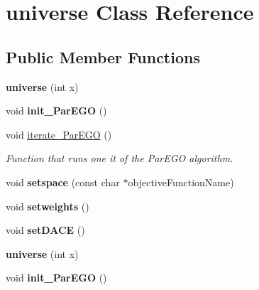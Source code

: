 \hypertarget{classuniverse}{}\section{universe Class Reference}
\label{classuniverse}
\subsection*{Public Member Functions}
\begin{DoxyCompactItemize}
\item 
\hypertarget{classuniverse_ad7994ce7b9e88a1faa56cf84f6c56b54}{}{\bfseries universe} (int x)\label{classuniverse_ad7994ce7b9e88a1faa56cf84f6c56b54}

\item 
\hypertarget{classuniverse_afe5bdbf5e9f3e4978becf23edcc7d201}{}void {\bfseries init\+\_\+\+Par\+E\+G\+O} ()\label{classuniverse_afe5bdbf5e9f3e4978becf23edcc7d201}

\item 
\hypertarget{classuniverse_a0b52db1da3e7f8f43a8946cbb87390d0}{}void \hyperlink{classuniverse_a0b52db1da3e7f8f43a8946cbb87390d0}{iterate\+\_\+\+Par\+E\+G\+O} ()\label{classuniverse_a0b52db1da3e7f8f43a8946cbb87390d0}

\begin{DoxyCompactList}\small\item\em Function that runs one it of the Par\+E\+G\+O algorithm. \end{DoxyCompactList}\item 
\hypertarget{classuniverse_a2bd3a92e07682c895e8143442f7f6419}{}void {\bfseries setspace} (const char $\ast$objective\+Function\+Name)\label{classuniverse_a2bd3a92e07682c895e8143442f7f6419}

\item 
\hypertarget{classuniverse_a5f97f94ebddc20321623d15d8ebcee26}{}void {\bfseries setweights} ()\label{classuniverse_a5f97f94ebddc20321623d15d8ebcee26}

\item 
\hypertarget{classuniverse_a7c14a7e92304b7acdb54d08d7a49d6c9}{}void {\bfseries set\+D\+A\+C\+E} ()\label{classuniverse_a7c14a7e92304b7acdb54d08d7a49d6c9}

\item 
\hypertarget{classuniverse_ad7994ce7b9e88a1faa56cf84f6c56b54}{}{\bfseries universe} (int x)\label{classuniverse_ad7994ce7b9e88a1faa56cf84f6c56b54}

\item 
\hypertarget{classuniverse_afe5bdbf5e9f3e4978becf23edcc7d201}{}void {\bfseries init\+\_\+\+Par\+E\+G\+O} ()\label{classuniverse_afe5bdbf5e9f3e4978becf23edcc7d201}


\end{DoxyCompactItemize}
